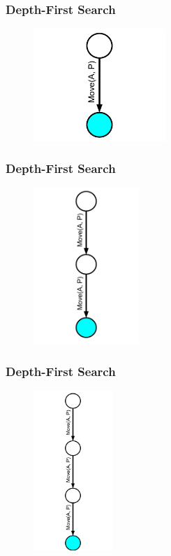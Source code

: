 \documentclass{beamer}
\begin{document}

\begin{frame}[fragile]
\frametitle{Depth-First Search}
\begin{figure}[h]
	\includegraphics[width=5cm]{Diagrams/DepthFirst/DepthFirstOne.pdf}
	\centering
\end{figure}
\end{frame}

\begin{frame}[fragile]
\frametitle{Depth-First Search}
\begin{figure}[h]
	\includegraphics[width=4cm]{Diagrams/DepthFirst/DepthFirstTwo.pdf}
	\centering
\end{figure}
\end{frame}

\begin{frame}[fragile]
\frametitle{Depth-First Search}
\begin{figure}[h]
	\includegraphics[width=3cm]{Diagrams/DepthFirst/DepthFirstThree.pdf}
	\centering
\end{figure}
\end{frame}
\end{document}
